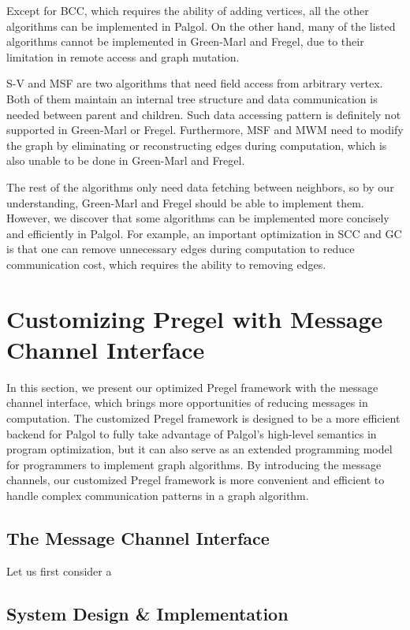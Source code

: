 \documentclass{sokendai_thesis} %
\begin{document}
Except for BCC, which requires the ability of adding vertices, all the other algorithms can be implemented in Palgol.
On the other hand, many of the listed algorithms cannot be implemented in Green-Marl and Fregel, due to their limitation in remote access and graph mutation.

S-V and MSF are two algorithms that need field access from arbitrary vertex.
Both of them maintain an internal tree structure and data communication is needed between parent and children.
Such data accessing pattern is definitely not supported in Green-Marl or Fregel.
Furthermore, MSF and MWM need to modify the graph by eliminating or reconstructing edges during computation, which is also unable to be done in Green-Marl and Fregel.

The rest of the algorithms only need data fetching between neighbors, so by our understanding, Green-Marl and Fregel should be able to implement them.
However, we discover that some algorithms can be implemented more concisely and efficiently in Palgol.
For example, an important optimization in SCC and GC is that one can remove unnecessary edges during computation to reduce communication cost, which requires the ability to removing edges.

\chapter{Customizing Pregel with Message Channel Interface}
\label{sec:customized}

In this section, we present our optimized Pregel framework with the message channel interface, which brings more opportunities of reducing messages in computation.
The customized Pregel framework is designed to be a more efficient backend for Palgol to fully take advantage of Palgol's high-level semantics in program optimization, but it can also serve as an extended programming model for programmers to implement graph algorithms.
By introducing the message channels, our customized Pregel framework is more convenient and efficient to handle complex communication patterns in a graph algorithm.

\section{The Message Channel Interface}

Let us first consider a 

\section{System Design \& Implementation}
\end{document}
